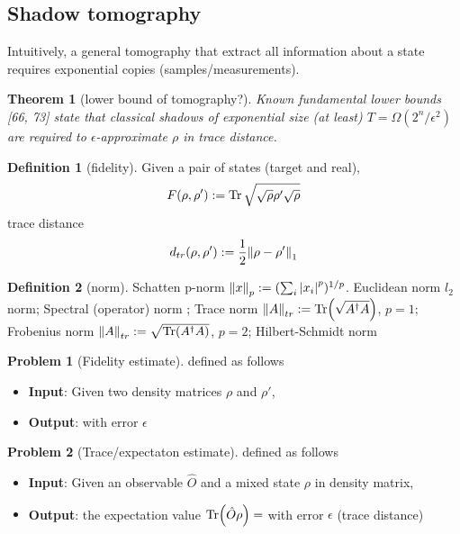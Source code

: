 \documentclass[
aps,
pra,
linenumbers,
floatfix,
]{revtex4-2}
\theoremstyle{plain}
\newtheorem{theorem}{Theorem}
\theoremstyle{definition}
\newtheorem{definition}{Definition}
\newtheorem{problem}{Problem}
\newcommand{\ob}{\hat{O}}
\newcommand{\dm}{\rho}
\begin{document}
\subsection{Shadow tomography}
Intuitively, a general tomography \cite{altepeterPhotonicStateTomography2005} that extract all information about a state requires exponential copies (samples/measurements).
\begin{theorem}[lower bound of tomography?\cite{haahSampleOptimalTomographyQuantum}]
	Known fundamental lower bounds [66, 73] state that classical shadows of exponential size (at least) $T = \Omega( 2^n / \epsilon^2)$ are required to $\epsilon$-approximate $\dm$ in trace distance.
\end{theorem}
\begin{definition}[fidelity]\label{def:fidelity}
	Given a pair of states (target and real), 
	\begin{equation}
		F(\rho,\rho') : = \Tr \sqrt{\sqrt{\rho}\rho'\sqrt{\rho}}
	\end{equation}
	trace distance
	\begin{equation}
		d_{tr}(\rho,\rho') : = \frac{1}{2} \norm{\rho-\rho'}_1
	\end{equation}
\end{definition}
\begin{definition}[norm]\label{def:norm}
	Schatten p-norm $\norm{x}_p:= (\sum_i \abs{x_i}^p)^{1/p}$.
	Euclidean norm $l_2$ norm;
	Spectral (operator) norm ;
	Trace norm $\norm{A}_{tr}:=\Tr(\sqrt{A^\dagger A})$, $p=1$;
	Frobenius norm $\norm{A}_{tr}:=\sqrt{\Tr(A^\dagger A)}$, $p=2$;
	Hilbert-Schmidt norm
\end{definition}
\begin{problem}[Fidelity estimate]
	defined as follows
	\begin{itemize}
		\item \textbf{Input}: Given two density matrices $\dm$ and $\dm'$, 
		\item \textbf{Output}:  with error $\epsilon$
	\end{itemize}
\end{problem}
\begin{problem}[Trace/expectaton estimate]
	defined as follows
	\begin{itemize}
		\item \textbf{Input}: Given an observable $\ob$ and a mixed state $\dm$ in density matrix,
		\item \textbf{Output}: the expectation value $\Tr(\ob \dm) = $ with error $\epsilon$ (trace distance)
	\end{itemize}
\end{problem}
\end{document}
